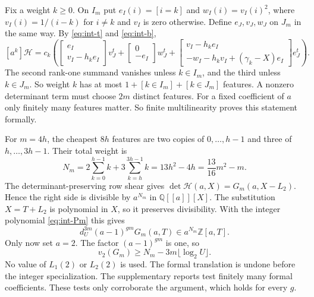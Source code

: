 Fix a weight \(k\ge0\). On \(I_m\) put \(e_I(i)=[i=k]\) and
\(w_I(i)=v_I(i)^2\), where \(v_I(i)=1/(i-k)\) for \(i\ne k\) and \(v_I\) is
zero otherwise. Define \(e_J,v_J,w_J\) on \(J_m\) in the same way. By
\eqref{eq:int-t} and \eqref{eq:int-b},
\begin{equation}\label{eq:int-rank-one}
 [a^k]\mathcal H=c_k\left(
 \begin{bmatrix}e_I\\v_I-h_ke_I\end{bmatrix}v_J^t
 +\begin{bmatrix}0\\-e_I\end{bmatrix}w_J^t
 +\begin{bmatrix}v_I-h_ke_I\\-w_I-h_kv_I+(\gamma_k-X)e_I\end{bmatrix}e_J^t
                  \right).
\end{equation}
The second rank-one summand vanishes unless \(k\in I_m\), and the third
unless \(k\in J_m\). So weight \(k\) has at most
\(1+[k\in I_m]+[k\in J_m]\) features. A nonzero determinant term must
choose \(2m\) distinct features. For a fixed coefficient of \(a\) only
finitely many features matter. So finite multilinearity proves this
statement formally.

For \(m=4h\), the cheapest \(8h\) features are two copies of
\(0,\ldots,h-1\) and three of \(h,\ldots,3h-1\). Their total weight is
\begin{equation}\label{eq:int-Nm}
 N_m=2\sum_{k=0}^{h-1}k+3\sum_{k=h}^{3h-1}k
                  =13h^2-4h=\frac{13}{16}m^2-m.
\end{equation}
The determinant-preserving row shear gives
\(\det\mathcal H(a,X)=G_m(a,X-L_2)\). Hence the right side is divisible
by \(a^{N_m}\) in \(\mathbb Q[[a]][X]\). The substitution \(X=T+L_2\) is
polynomial in \(X\), so it preserves divisibility. With the integer
polynomial \eqref{eq:int-Pm} this gives
\begin{equation}\label{eq:int-divisible}
 d_U^{3m}(a-1)^{gm}G_m(a,T)\in a^{N_m}\mathbb Z[a,T].
\end{equation}
Only now set \(a=2\). The factor \((a-1)^{gm}\) is one, so
\begin{equation}\label{eq:int-twoadic}
 v_2(G_m)\ge N_m-3m\lfloor\log_2U\rfloor.
\end{equation}
No value of \(L_1(2)\) or \(L_2(2)\) is used. The formal translation is
undone before the integer specialization. The supplementary reports test
finitely many formal coefficients. These tests only corroborate the
argument, which holds for every \(g\).


